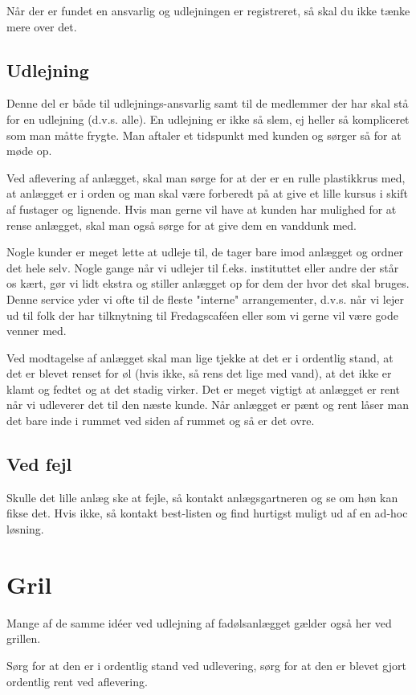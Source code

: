 Når der er fundet en ansvarlig og udlejningen er registreret, så skal du ikke tænke mere over det.

\subsection{Udlejning}
Denne del er både til udlejnings-ansvarlig samt til de medlemmer der har skal stå for en udlejning (d.v.s. alle). En udlejning er ikke så slem, ej heller så kompliceret som man måtte frygte. Man aftaler et tidspunkt med kunden og sørger så for at møde op.

Ved aflevering af anlægget, skal man sørge for at der er en rulle plastikkrus med, at anlægget er i orden og man skal være forberedt på at give et lille kursus i skift af fustager og lignende. Hvis man gerne vil have at kunden har mulighed for at rense anlægget, skal man også sørge for at give dem en vanddunk med.

Nogle kunder er meget lette at udleje til, de tager bare imod anlægget og ordner det hele selv. Nogle gange når vi udlejer til f.eks. instituttet eller andre der står os kært, gør vi lidt ekstra og stiller anlægget op for dem der hvor det skal bruges. Denne service yder vi ofte til de fleste "interne" arrangementer, d.v.s. når vi lejer ud til folk der har tilknytning til Fredagscaféen eller som vi gerne vil være gode venner med.

Ved modtagelse af anlægget skal man lige tjekke at det er i ordentlig stand, at det er blevet renset for øl (hvis ikke, så rens det lige med vand), at det ikke er klamt og fedtet og at det stadig virker. Det er meget vigtigt at anlægget er rent når vi udleverer det til den næste kunde. Når anlægget er pænt og rent låser man det bare inde i rummet ved siden af rummet og så er det ovre.

\subsection{Ved fejl}
Skulle det lille anlæg ske at fejle, så kontakt anlægsgartneren og se om høn kan fikse det. Hvis ikke, så kontakt best-listen og find hurtigst muligt ud af en ad-hoc løsning.

\section{Gril}
Mange af de samme idéer ved udlejning af fadølsanlægget gælder også her ved grillen.

Sørg for at den er i ordentlig stand ved udlevering, sørg for at den er blevet gjort ordentlig rent ved aflevering.

